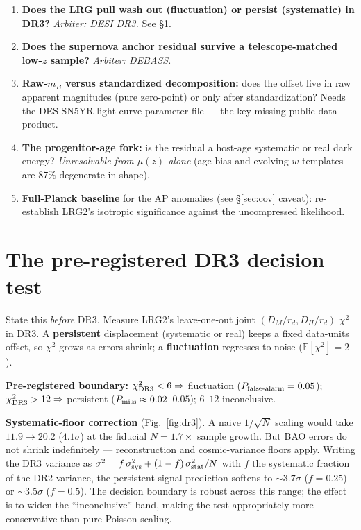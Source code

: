 \documentclass[11pt]{article}
\newcommand{\Dmrd}{\ensuremath{D_M/r_d}}
\newcommand{\Dhrd}{\ensuremath{D_H/r_d}}
\newcommand{\chisq}{\ensuremath{\chi^2}}
\begin{document}
\begin{enumerate}[leftmargin=1.3em,itemsep=0.4em]
\item \textbf{Does the LRG pull wash out (fluctuation) or persist (systematic) in DR3?} \emph{Arbiter: DESI DR3.} See \S\ref{sec:dr3}.
\item \textbf{Does the supernova anchor residual survive a telescope-matched low-$z$ sample?} \emph{Arbiter: DEBASS.}
\item \textbf{Raw-$m_B$ versus standardized decomposition:} does the offset live in raw apparent magnitudes (pure zero-point) or only after standardization? Needs the DES-SN5YR light-curve parameter file --- the key missing public data product.
\item \textbf{The progenitor-age fork:} is the residual a host-age systematic or real dark energy? \emph{Unresolvable from $\mu(z)$ alone} (age-bias and evolving-$w$ templates are $87\%$ degenerate in shape).
\item \textbf{Full-Planck baseline} for the AP anomalies (see \S\ref{sec:cov} caveat): re-establish LRG2's isotropic significance against the uncompressed likelihood.
\end{enumerate}

\section{The pre-registered DR3 decision test}\label{sec:dr3}

State this \emph{before} DR3. Measure LRG2's leave-one-out joint $(\Dmrd,\Dhrd)$ \chisq{} in DR3. A \textbf{persistent} displacement (systematic or real) keeps a fixed data-units offset, so \chisq{} grows as errors shrink; a \textbf{fluctuation} regresses to noise ($\mathbb{E}[\chisq]=2$).

\textbf{Pre-registered boundary:} $\chisq_{\rm DR3}<6\Rightarrow$ fluctuation ($P_{\rm false\text{-}alarm}=0.05$); $\chisq_{\rm DR3}>12\Rightarrow$ persistent ($P_{\rm miss}\approx0.02$--$0.05$); $6$--$12$ inconclusive.

\textbf{Systematic-floor correction} (Fig.~\ref{fig:dr3}). A naive $1/\sqrt{N}$ scaling would take $11.9\to20.2$ ($4.1\sigma$) at the fiducial $N=1.7\times$ sample growth. But BAO errors do not shrink indefinitely --- reconstruction and cosmic-variance floors apply. Writing the DR3 variance as $\sigma^2 = f\,\sigma^2_{\rm sys}+(1-f)\,\sigma^2_{\rm stat}/N$ with $f$ the systematic fraction of the DR2 variance, the persistent-signal prediction softens to $\sim\!3.7\sigma$ ($f=0.25$) or $\sim\!3.5\sigma$ ($f=0.5$). The decision boundary is robust across this range; the effect is to widen the ``inconclusive'' band, making the test appropriately more conservative than pure Poisson scaling.
\end{document}
